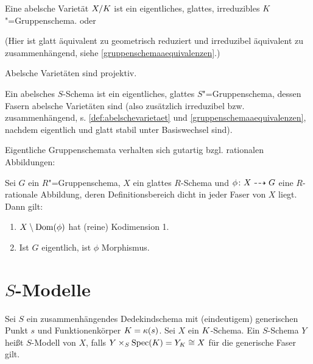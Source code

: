 \documentclass[german]{scrreprt}
\begin{document}
\begin{Definition}\label{def:abelschevarietaet}
  Eine abelsche Varietät $X/K$ ist ein eigentliches, glattes,
  irreduzibles $K$"=Gruppenschema.
  \cite[9.6, Definition 1]{bosch} oder \cite[Definition 16.52]{wedhorn}

  (Hier ist glatt äquivalent zu geometrisch reduziert und irreduzibel
  äquivalent zu zusammenhängend, 
  siehe \ref{gruppenschemaaequivalenzen}.)

  \begin{Bemerkung}\label{thm:abvarietaetprojektiv}
    Abelsche Varietäten sind projektiv.
    \cite[9.6, Proposition 4]{bosch}
  \end{Bemerkung}
\end{Definition}

\begin{Definition}
  Ein abelsches $S$-Schema ist ein eigentliches, glattes $S$"=Gruppenschema,
  dessen Fasern abelsche Varietäten sind 
  (also zusätzlich irreduzibel bzw. zusammenhängend,
  s. \ref{def:abelschevarietaet} und \ref{gruppenschemaaequivalenzen},
  nachdem eigentlich und glatt stabil unter Basiswechsel sind).
\end{Definition}

Eigentliche Gruppenschemata verhalten sich gutartig bzgl. rationalen
Abbildungen: 
\begin{Lemma}\label{thm:rationalzumorphismus}
  Sei $G$ ein $R$"=Gruppenschema, $X$ ein glattes $R$-Schema und
  $\phi\colon X\dashrightarrow G$ eine $R$-rationale Abbildung, deren
  Definitionsbereich dicht in jeder Faser von $X$ liegt.
  Dann gilt:
  \begin{enumerate}[label=(\roman*)]
  \item $X\setminus \operatorname{Dom}(\phi)$ hat (reine) Kodimension 1.
  \item Ist $G$ eigentlich, ist $\phi$ Morphismus.
  \end{enumerate}
  \cite[Proposition IV.6.2]{silverman2}
\end{Lemma}



\chapter{$S$-Modelle}
\begin{Definition}[$S$-Modell]
  Sei $S$ ein zusammenhängendes Dedekindschema mit (eindeutigem)
  generischen Punkt $s$ und Funktionenkörper $K=\kappa(s)$.
  Sei $X$ ein $K$-Schema.
  Ein $S$-Schema $Y$ heißt $S$-Modell von $X$, falls
  $Y\times_S\operatorname{Spec}(K)=Y_K\cong X$ für die generische Faser gilt.
\end{Definition}
\end{document}
